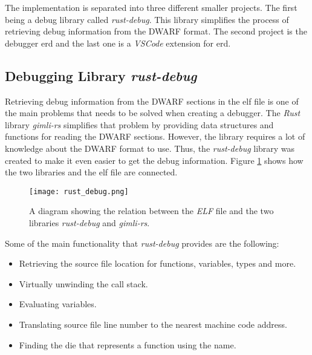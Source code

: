  

The implementation is separated into three different smaller projects.
The first being a debug library called \emph{rust-debug}.
This library simplifies the process of retrieving debug information from the \gls{DWARF} format.
The second project is the debugger \gls{erd} and the last one is a \emph{VSCode} extension for \gls{erd}.


\subsection{Debugging Library \emph{rust-debug}}
\label{subsection:rust-debug}

Retrieving debug information from the \gls{DWARF} sections in the \gls{elf} file is one of the main problems that needs to be solved when creating a debugger.
The \emph{Rust} library \emph{gimli-rs} simplifies that problem by providing data structures and functions for reading the \gls{DWARF} sections.
However, the library requires a lot of knowledge about the \gls{DWARF} format to use.
Thus, the \emph{rust-debug} library was created to make it even easier to get the debug information.
Figure \ref{fig:rustdebug} shows how the two libraries and the \gls{elf} file are connected.


\begin{figure}[h]
	\centering
	\texttt{[image: rust\_debug.png]}
	\caption{A diagram showing the relation between the \emph{ELF} file and the two libraries \emph{rust-debug} and \emph{gimli-rs}.}
	\label{fig:rustdebug}
\end{figure}


Some of the main functionality that \emph{rust-debug} provides are the following:

\begin{itemize}
  \item Retrieving the source file location for functions, variables, types and more.
  \item Virtually unwinding the call stack.
  \item Evaluating variables.
  \item Translating source file line number to the nearest machine code address.
  \item Finding the \gls{die} that represents a function using the name.
\end{itemize}

